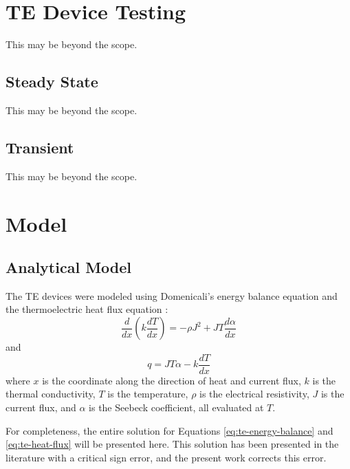 \documentclass[preprint,authoryear,12pt]{elsarticle}
\begin{document}
\section{TE Device Testing}
\label{sec:te-device-testing}


This may be beyond the scope.  

\subsection{Steady State}
\label{sec:exp-steady-state}

This may be beyond the scope.  

\subsection{Transient}
\label{sec:exp-transient}

This may be beyond the scope.  

\section{Model}
\label{sec:model}

\subsection{Analytical Model}
\label{sec:analy-model}


The TE devices were modeled using Domenicali's energy balance equation
and the thermoelectric heat flux equation
\cite{domenicali_irreversible_1953,hogan_modeling_2006}:
\begin{equation}
  \label{eq:te-energy-balance}
  \frac{d}{d x} \left(k \frac{d T}{d x}
  \right) = - \rho J^2 + J T \frac{d \alpha}{d x}
\end{equation}
and
\begin{equation}
  \label{eq:te-heat-flux}
  q = J T \alpha - k \frac{d T}{d x}
\end{equation}
where $x$ is the coordinate along the direction of heat and current
flux, $k$ is the thermal conductivity, $T$ is the temperature, $\rho$
is the electrical resistivity, $J$ is the current flux, and $\alpha$
is the Seebeck coefficient, all evaluated at $T$.

For completeness, the entire solution for Equations
\ref{eq:te-energy-balance} and \ref{eq:te-heat-flux} will be presented
here.  This solution has been presented in the literature
\cite{hogan_modeling_2006} with a critical sign error, and the present
work corrects this error.
\end{document}

